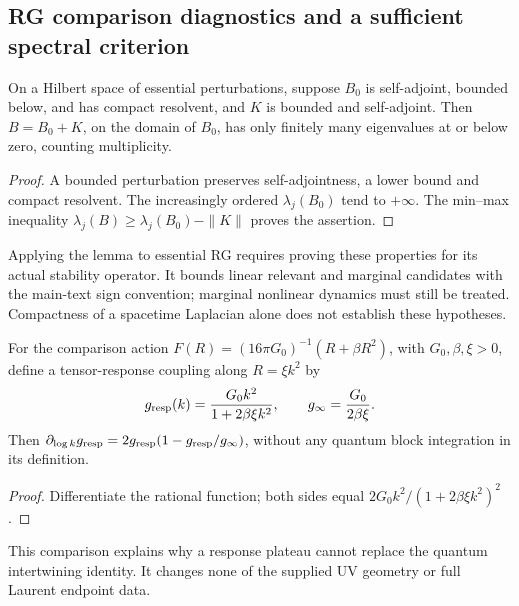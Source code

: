\documentclass[12pt,a4paper]{article}
\begin{document}
\subsection{RG comparison diagnostics and a sufficient spectral criterion}
\label{p12:app:v199-rgas-diagnostics}

\begin{proposition}
\label{p12:prop:v199-rgas-spectral-criterion}
On a Hilbert space of essential perturbations, suppose \(B_0\) is
self-adjoint, bounded below, and has compact resolvent, and \(K\) is
bounded and self-adjoint.  Then \(B=B_0+K\), on the domain of \(B_0\),
has only finitely many eigenvalues at or below zero, counting multiplicity.
\end{proposition}
\begin{proof}
A bounded perturbation preserves self-adjointness, a lower bound and
compact resolvent.  The increasingly ordered \(\lambda_j(B_0)\) tend to
\(+\infty\).  The min--max inequality
\(\lambda_j(B)\ge\lambda_j(B_0)-\|K\|\) proves the assertion.
\end{proof}
Applying the lemma to essential RG requires proving these properties
for its actual stability operator.  It bounds linear relevant and
marginal candidates with the main-text sign convention; marginal
nonlinear dynamics must still be treated.  Compactness of a spacetime
Laplacian alone does not establish these hypotheses.

\begin{proposition}
\label{p12:prop:v199-rgas-response-plateau}
For the comparison action \(F(R)=(16\pi G_0)^{-1}(R+\beta R^2)\),
with \(G_0,\beta,\xi>0\), define a tensor-response coupling along
\(R=\xi k^2\) by
\[
 g_{\rm resp}(k)=\frac{G_0k^2}{1+2\beta\xi k^2},\qquad
 g_\infty=\frac{G_0}{2\beta\xi}.
\]
Then \(\partial_{\log k}g_{\rm resp}
=2g_{\rm resp}(1-g_{\rm resp}/g_\infty)\), without any quantum block
integration in its definition.
\end{proposition}
\begin{proof}
Differentiate the rational function; both sides equal
\(2G_0k^2/(1+2\beta\xi k^2)^2\).
\end{proof}
This comparison explains why a response plateau cannot replace the
quantum intertwining identity.  It changes none of the supplied UV
geometry or full Laurent endpoint data.
\end{document}
